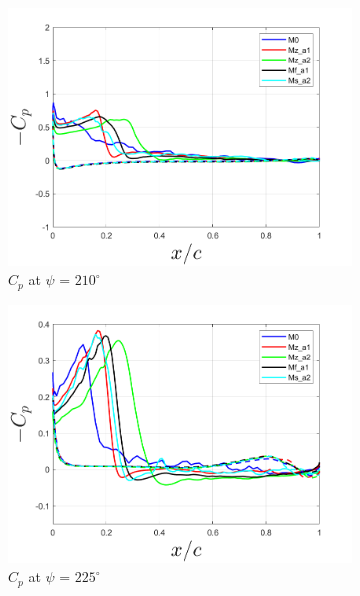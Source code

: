 \begin{figure}[H]
\begin{subfigure}[b]{0.475\textwidth}
\centering
\includegraphics[width=1\textwidth]{figures/Results/Cp_plots/Cp_ph_210.png}
\caption{ $C_p$ at $\psi$ = $210^\circ$}
\label{fig:Cp_210}
\end{subfigure}
\begin{subfigure}[b]{0.475\textwidth}
\centering
\includegraphics[width=1\textwidth]{figures/Results/Cp_plots/Cp_ph_225.png}
\caption{ $C_p$ at $\psi$ = $225^\circ$}
\label{fig:Cp_225}
\end{subfigure}
\begin{subfigure}[b]{0.475\textwidth}
\centering

\end{subfigure}
\end{figure}
